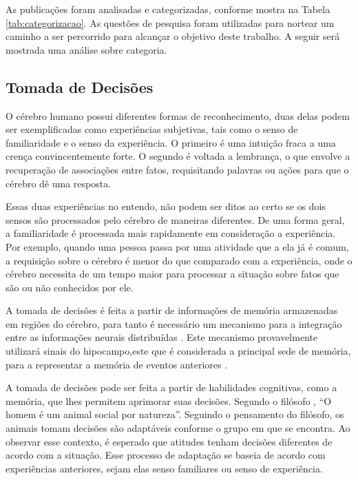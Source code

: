 As publicações foram analisadas e categorizadas, conforme mostra na Tabela \ref{tab:categorizacao}. As questões de pesquisa foram utilizadas para nortear um caminho a ser percorrido para alcançar o objetivo deste trabalho. A seguir será mostrada uma análise sobre categoria.

\subsection{Tomada de Decisões}
\label{subsec:decisoes}

O cérebro humano possui diferentes formas de reconhecimento, duas delas podem ser exemplificadas como experiências subjetivas, tais como o senso de familiaridade e o senso da experiência. O primeiro é uma intuição fraca a uma crença convincentemente forte. O segundo é voltada a lembrança, o que envolve a recuperação de associações entre fatos, requisitando palavras ou ações para que o cérebro dê uma resposta.

Essas duas experiências no entendo, não podem ser ditos ao certo se os dois sensos são processados pelo cérebro de maneiras diferentes. De uma forma geral, a familiaridade é processada mais rapidamente em consideração a experiência. Por exemplo, quando uma pessoa passa por uma atividade que a ela já é comum, a requisição sobre o cérebro é menor do que comparado com a experiência, onde o cérebro necessita de um tempo maior para processar a situação sobre fatos que são ou não conhecidos por ele. 

A tomada de decisões é feita a partir de informações de memória armazenadas em regiões do cérebro, para tanto é necessário um mecanismo para a integração entre as informações neurais distribuídas \cite{buzsaki}. Este mecanismo provavelmente utilizará sinais do hipocampo,este que é considerada a principal sede de memória, para a representar a memória de eventos anteriores \cite{eichenbaum}.

A tomada de decisões pode ser feita a partir de habilidades cognitivas, como a memória, que lhes permitem aprimorar suas decisões. Segundo o filósofo \cite{aristoteles}, “O homem é um animal social por natureza”. Seguindo o pensamento do filósofo, os animais tomam decisões são adaptáveis conforme o grupo em que se encontra. Ao observar esse contexto, é esperado que atitudes tenham decisões diferentes de acordo com a situação. Esse processo de adaptação se baseia de acordo com experiências anteriores, sejam elas senso familiares ou senso de experiência.

